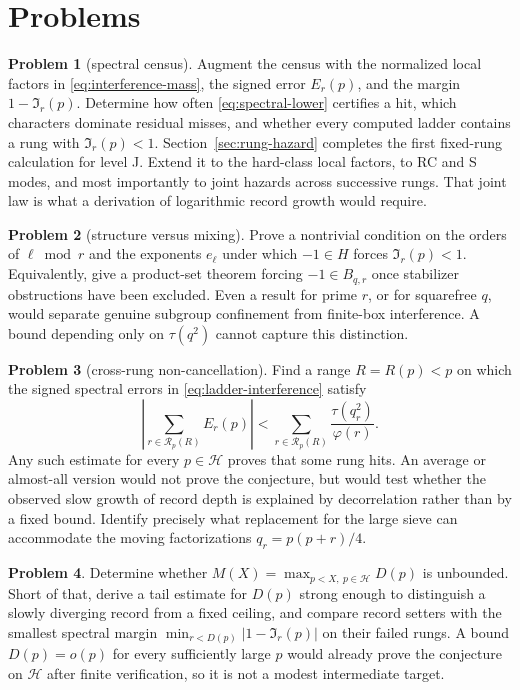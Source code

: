 \documentclass[11pt]{article}
\theoremstyle{definition}
\newtheorem{problem}{Problem}
\theoremstyle{remark}
\begin{document}
\section{Problems}\label{sec:problems}

\begin{problem}[spectral census]\label{prob:sd}
Augment the census with the normalized local factors in
\eqref{eq:interference-mass}, the signed error $E_r(p)$, and the margin
$1-\mathfrak I_r(p)$. Determine how often \eqref{eq:spectral-lower} certifies a hit,
which characters dominate residual misses, and whether every computed ladder contains
a rung with $\mathfrak I_r(p)<1$. Section~\ref{sec:rung-hazard} completes the first
fixed-rung calculation for level J. Extend it to the hard-class local factors, to RC
and S modes, and most importantly to joint hazards across successive rungs. That joint
law is what a derivation of logarithmic record growth would require.
\end{problem}

\begin{problem}[structure versus mixing]\label{prob:divisors}
Prove a nontrivial condition on the orders of $\ell\bmod r$ and the exponents $e_\ell$
under which $-1\in H$ forces $\mathfrak I_r(p)<1$. Equivalently, give a product-set
theorem forcing $-1\in B_{q,r}$ once stabilizer obstructions have been excluded.
Even a result for prime $r$, or for squarefree $q$, would separate genuine subgroup
confinement from finite-box interference. A bound depending only on $\tau(q^2)$ cannot
capture this distinction.
\end{problem}

\begin{problem}[cross-rung non-cancellation]\label{prob:interference}
Find a range $R=R(p)<p$ on which the signed spectral errors in
\eqref{eq:ladder-interference} satisfy
\[
 \left|\sum_{r\in\mathcal R_p(R)}E_r(p)\right|
 <\sum_{r\in\mathcal R_p(R)}\frac{\tau(q_r^2)}{\varphi(r)}.
\]
Any such estimate for every $p\in\mathcal H$ proves that some rung hits. An average or
almost-all version would not prove the conjecture, but would test whether the observed
slow growth of record depth is explained by decorrelation rather than by a fixed bound.
Identify precisely what replacement for the large sieve can accommodate the moving
factorizations $q_r=p(p+r)/4$.
\end{problem}

\begin{problem}\label{prob:bound}
Determine whether $M(X)=\max_{p<X,\ p\in\mathcal H}D(p)$ is unbounded. Short of that,
derive a tail estimate for $D(p)$ strong enough to distinguish a slowly diverging record
from a fixed ceiling, and compare record setters with the smallest spectral margin
$\min_{r<D(p)}|1-\mathfrak I_r(p)|$ on their failed rungs. A bound $D(p)=o(p)$ for
every sufficiently large $p$ would already prove the conjecture on $\mathcal H$ after
finite verification, so it is not a modest intermediate target.
\end{problem}
\end{document}
